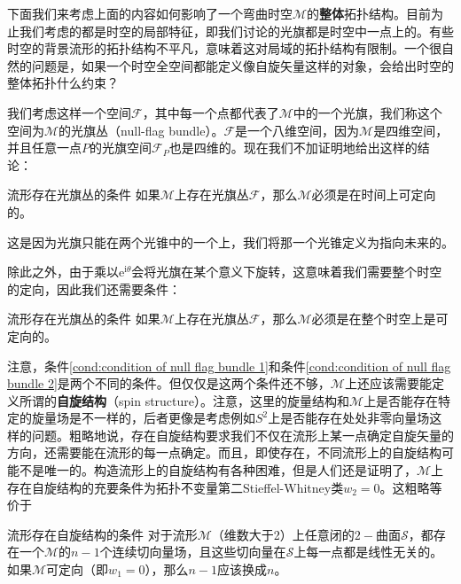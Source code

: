 下面我们来考虑上面的内容如何影响了一个弯曲时空$\mathcal{M}$的\textbf{整体}拓扑结构。目前为止我们考虑的都是时空的局部特征，即我们讨论的光旗都是时空中一点上的。有些时空的背景流形的拓扑结构不平凡，意味着这对局域的拓扑结构有限制。一个很自然的问题是，如果一个时空全空间都能定义像自旋矢量这样的对象，会给出时空的整体拓扑什么约束？



我们考虑这样一个空间$\mathcal{F}$，其中每一个点都代表了$\mathcal{M}$中的一个光旗，我们称这个空间为$\mathcal{M}$的光旗丛（null-flag bundle）。$\mathcal{F}$是一个八维空间，因为$\mathcal{M}$是四维空间，并且任意一点$P$的光旗空间$\mathcal{F}_{P}$也是四维的。现在我们不加证明地给出这样的结论：

\begin{cond}[label={cond:condition of null flag bundle 1}]{流形存在光旗丛的条件}
	如果$\mathcal{M}$上存在光旗丛$\mathcal{F}$，那么$\mathcal{M}$必须是在时间上可定向的。
\end{cond}

这是因为光旗只能在两个光锥中的一个上，我们将那一个光锥定义为指向未来的。

除此之外，由于乘以$\mathrm{e}^{\mathrm{i} \theta }$会将光旗在某个意义下旋转，这意味着我们需要整个时空的定向，因此我们还需要条件：

\begin{cond}[label={cond:condition of null flag bundle 2}]{流形存在光旗丛的条件}
	如果$\mathcal{M}$上存在光旗丛$\mathcal{F}$，那么$\mathcal{M}$必须是在整个时空上是可定向的。
\end{cond}

注意，条件\ref{cond:condition of null flag bundle 1}和条件\ref{cond:condition of null flag bundle 2}是两个不同的条件。但仅仅是这两个条件还不够，$\mathcal{M}$上还应该需要能定义所谓的\textbf{自旋结构}（spin structure）。注意，这里的旋量结构和$\mathcal{M}$上是否能存在特定的旋量场是不一样的，后者更像是考虑例如$S^{2}$上是否能存在处处非零向量场这样的问题。粗略地说，存在自旋结构要求我们不仅在流形上某一点确定自旋矢量的方向，还需要能在流形的每一点确定。而且，即使存在，不同流形上的自旋结构可能不是唯一的。构造流形上的自旋结构有各种困难，但是人们还是证明了，$\mathcal{M}$上存在自旋结构的充要条件为拓扑不变量第二Stieffel-Whitney类$w_{2} =0$。这粗略等价于

\begin{cond}[label={cond:condition of spin structure}]{流形存在自旋结构的条件}
	对于流形$\mathcal{M}$（维数大于2）上任意闭的$2-$曲面$\mathcal{S}$，都存在一个$\mathcal{M}$的$n-1$个连续切向量场，且这些切向量在$\mathcal{S}$上每一点都是线性无关的。如果$\mathcal{M}$可定向（即$w_{1} =0$），那么$n-1$应该换成$n$。
\end{cond}

